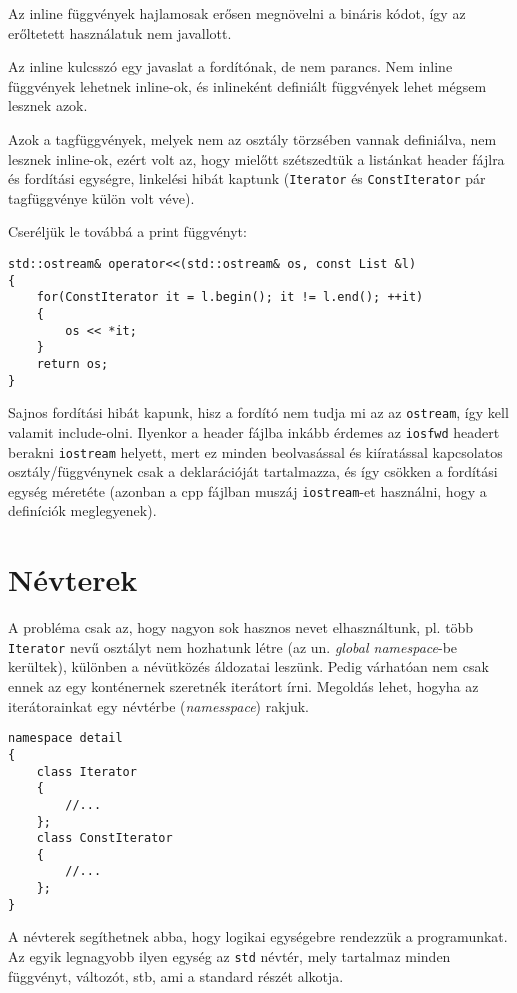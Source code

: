 \documentclass[a4paper,11.5pt]{article}
\begin{document}
	\begin{note}
		Az inline függvények hajlamosak erősen megnövelni a bináris kódot, így az erőltetett használatuk nem javallott.
	\end{note}
	\begin{note}
		Az inline kulcsszó egy javaslat a fordítónak, de nem parancs. Nem inline függvények lehetnek inline-ok, és inlineként definiált függvények lehet mégsem lesznek azok.
	\end{note}
	Azok a tagfüggvények, melyek nem az osztály törzsében vannak definiálva, nem lesznek inline-ok, ezért volt az, hogy mielőtt szétszedtük a listánkat header fájlra és fordítási egységre, linkelési hibát kaptunk (\texttt{Iterator} és \texttt{ConstIterator} pár tagfüggvénye külön volt véve).
	\medskip
	
	Cseréljük le továbbá a print függvényt:
	
	\begin{lstlisting}
std::ostream& operator<<(std::ostream& os, const List &l)
{
	for(ConstIterator it = l.begin(); it != l.end(); ++it)
	{
		os << *it;
	}
	return os;
}
	\end{lstlisting}
	Sajnos fordítási hibát kapunk, hisz a fordító nem tudja mi az az \texttt{ostream}, így kell valamit include-olni. Ilyenkor a header fájlba inkább érdemes az \texttt{iosfwd} headert berakni \texttt{iostream} helyett, mert ez minden beolvasással és kiíratással kapcsolatos osztály/függvénynek csak a deklarációját tartalmazza, és így csökken a fordítási egység méretéte (azonban a cpp fájlban muszáj \texttt{iostream}-et használni, hogy a definíciók meglegyenek).
	\section{Névterek}
	
	A probléma csak az, hogy nagyon sok hasznos nevet elhasználtunk, pl. több \texttt{Iterator} nevű osztályt nem hozhatunk létre (az un. \textit{global namespace}-be kerültek), különben a névütközés áldozatai leszünk. Pedig várhatóan nem csak ennek az egy konténernek szeretnék iterátort írni. Megoldás lehet, hogyha az iterátorainkat egy névtérbe (\textit{namesspace}) rakjuk.
\begin{lstlisting}
namespace detail
{
	class Iterator
	{
		//...
	};
	class ConstIterator
	{
		//...
	};
}
\end{lstlisting}
	A névterek segíthetnek abba, hogy logikai egységebre rendezzük a programunkat. Az egyik legnagyobb ilyen egység az \texttt{std} névtér, mely tartalmaz minden függvényt, változót, stb, ami a standard részét alkotja. 
	
\end{document}
